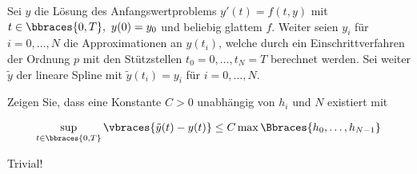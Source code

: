 \begin{exercise}
  Sei $y$ die Lösung des Anfangswertproblems
  $y'(t) = f(t,y)$ mit $t \in \bbraces{0,T}, \text{ } y(0)=y_0$
  und beliebig glattem $f$. Weiter seien $y_i$ für $i=0,\ldots,N$ die Approximationen
  an $y(t_i)$, welche durch ein Einschrittverfahren der Ordnung $p$ mit den
  Stützstellen $t_0 = 0,\ldots,t_N =T$ berechnet werden. Sei weiter $\tilde{y}$ der
  lineare Spline mit $\tilde{y}(t_i)=y_i$ für $i=0,\ldots,N$.

  Zeigen Sie, dass eine Konstante $C>0$ unabhängig von $h_i$ und $N$ existiert mit

  \begin{align}
    \sup_{t \in \bbraces{0,T}} \vbraces{\tilde{y}(t)-y(t)}
    \leq
    C \max\Bbraces{h_0,\ldots,h_{N-1}}
  \end{align}
\end{exercise}

\begin{solution}
  Trivial!
\end{solution}
